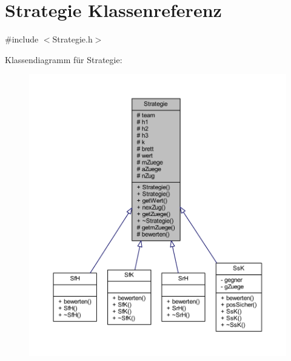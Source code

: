 \hypertarget{class_strategie}{}\section{Strategie Klassenreferenz}
\label{class_strategie}


{\ttfamily \#include $<$Strategie.\+h$>$}



Klassendiagramm für Strategie\+:\nopagebreak
\begin{figure}[H]
\begin{center}
\leavevmode
\includegraphics[width=350pt]{class_strategie__inherit__graph}
\end{center}
\end{figure}


